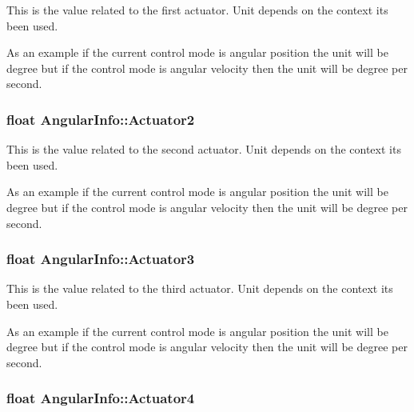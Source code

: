 This is the value related to the first actuator. Unit depends on the context it\textquotesingle{}s been used. 

As an example if the current control mode is angular position the unit will be degree but if the control mode is angular velocity then the unit will be degree per second. 
\subsubsection[{\texorpdfstring{Actuator2}{Actuator2}}]{\setlength{\rightskip}{0pt plus 5cm}float Angular\+Info\+::\+Actuator2}\hypertarget{structAngularInfo_ab7b9349eef239f9741d9c28a795e4c35}{}\label{structAngularInfo_ab7b9349eef239f9741d9c28a795e4c35}


This is the value related to the second actuator. Unit depends on the context it\textquotesingle{}s been used. 

As an example if the current control mode is angular position the unit will be degree but if the control mode is angular velocity then the unit will be degree per second. 
\subsubsection[{\texorpdfstring{Actuator3}{Actuator3}}]{\setlength{\rightskip}{0pt plus 5cm}float Angular\+Info\+::\+Actuator3}\hypertarget{structAngularInfo_a30426eab94c82cfd3d697bbc8c506c2a}{}\label{structAngularInfo_a30426eab94c82cfd3d697bbc8c506c2a}


This is the value related to the third actuator. Unit depends on the context it\textquotesingle{}s been used. 

As an example if the current control mode is angular position the unit will be degree but if the control mode is angular velocity then the unit will be degree per second. 
\subsubsection[{\texorpdfstring{Actuator4}{Actuator4}}]{\setlength{\rightskip}{0pt plus 5cm}float Angular\+Info\+::\+Actuator4}\hypertarget{structAngularInfo_a46a1314c4846de6a495310b44fe5e0c3}{}\label{structAngularInfo_a46a1314c4846de6a495310b44fe5e0c3}


